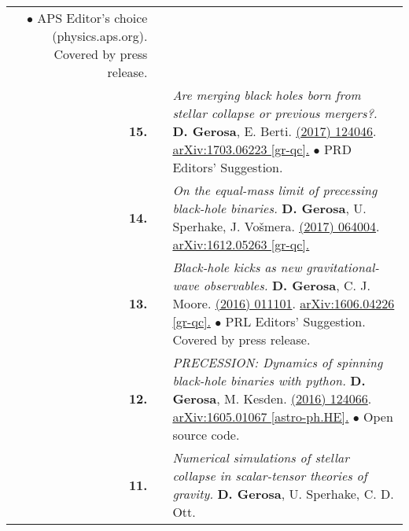 {\begin{longtable}{rp{0.3cm}p{15.8cm}}
\textcolor{color1}{$\bullet$} APS Editor's choice (physics.aps.org). Covered by press release.
\vspace{0.09cm}\\
%
\textbf{15.} & & \textit{Are merging black holes born from stellar collapse or previous mergers?.}
\newline{}
\textbf{D. Gerosa}, E. Berti.
\newline{}
\href{http://dx.doi.org/10.1103/PhysRevD.95.124046}{\prd 95 (2017) 124046}. \href{https://arxiv.org/abs/1703.06223}{arXiv:1703.06223 [gr-qc].}
\newline{}
\textcolor{color1}{$\bullet$} PRD Editors' Suggestion.
\vspace{0.09cm}\\
%
\textbf{14.} & & \textit{On the equal-mass limit of precessing black-hole binaries.}
\newline{}
\textbf{D. Gerosa}, U. Sperhake, J. Vo\v{s}mera.
\newline{}
\href{http://dx.doi.org/10.1088/1361-6382/aa5e58}{\cqg 34 (2017) 064004}. \href{https://arxiv.org/abs/1612.05263}{arXiv:1612.05263 [gr-qc].}
\vspace{0.09cm}\\
%
\textbf{13.} & & \textit{Black-hole kicks as new gravitational-wave observables.}
\newline{}
\textbf{D. Gerosa}, C. J. Moore.
\newline{}
\href{http://dx.doi.org/10.1103/PhysRevLett.117.011101}{\prl 117 (2016) 011101}. \href{https://arxiv.org/abs/1606.04226}{arXiv:1606.04226 [gr-qc].}
\newline{}
\textcolor{color1}{$\bullet$} PRL Editors' Suggestion. Covered by press release.
\vspace{0.09cm}\\
%
\textbf{12.} & & \textit{PRECESSION: Dynamics of spinning black-hole binaries with python.}
\newline{}
\textbf{D. Gerosa}, M. Kesden.
\newline{}
\href{http://dx.doi.org/10.1103/PhysRevD.93.124066}{\prd 93 (2016) 124066}. \href{https://arxiv.org/abs/1605.01067}{arXiv:1605.01067 [astro-ph.HE].}
\newline{}
\textcolor{color1}{$\bullet$} Open source code.
\vspace{0.09cm}\\
%
\textbf{11.} & & \textit{Numerical simulations of stellar collapse in scalar-tensor theories of gravity.}
\newline{}
\textbf{D. Gerosa}, U. Sperhake, C. D. Ott.

\end{longtable}}
